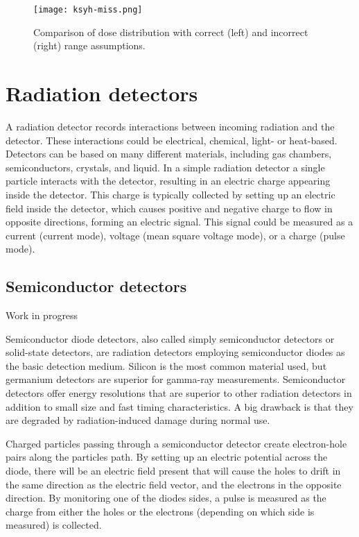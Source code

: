 \documentclass[../main/thesis.tex]{subfiles}
\begin{document}
\begin{figure}%
	\centering
	\texttt{[image: ksyh-miss.png]}
	\caption{Comparison of dose distribution with correct (left) and incorrect (right) range assumptions. \citep{ksyh-phys251}}
	\label{fig-miss}
\end{figure}

\section{Radiation detectors}
\label{t-detector}
A radiation detector records interactions between incoming radiation and the detector. These interactions could be electrical, chemical, light- or heat-based. Detectors can be based on many different materials, including gas chambers, semiconductors, crystals, and liquid. In a simple radiation detector a single particle interacts with the detector, resulting in an electric charge appearing inside the detector. This charge is typically collected by setting up an electric field inside the detector, which causes positive and negative charge to flow in opposite directions, forming an electric signal. This signal could be measured as a current (current mode), voltage (mean square voltage mode), or a charge (pulse mode). \citep[chap. 4]{Knoll}



\subsection{Semiconductor detectors}
\label{t-semi}
Work in progress

Semiconductor diode detectors, also called simply semiconductor detectors or solid-state detectors, are radiation detectors employing semiconductor diodes as the basic detection medium. Silicon is the most common material used, but germanium detectors are superior for gamma-ray measurements. Semiconductor detectors offer energy resolutions that are superior to other radiation detectors in addition to small size and fast timing characteristics. A big drawback is that they are degraded by radiation-induced damage during normal use. 

Charged particles passing through a semiconductor detector create electron-hole pairs along the particles path. By setting up an electric potential across the diode, there will be an electric field present that will cause the holes to drift in the same direction as the electric field vector, and the electrons in the opposite direction. By monitoring one of the diodes sides, a pulse is measured as the charge from either the holes or the electrons (depending on which side is measured) is collected. 
\end{document}
